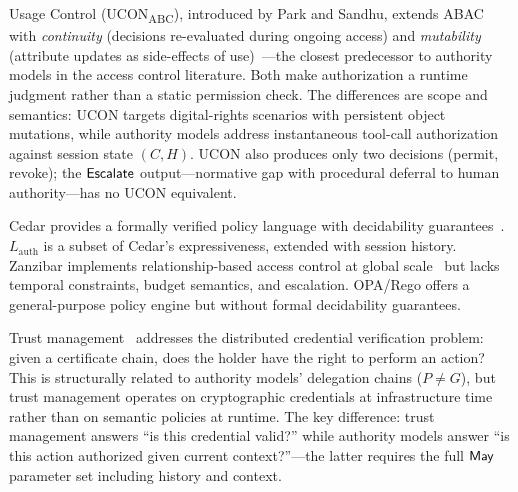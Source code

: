 \documentclass[11pt,a4paper]{article}
\newcommand{\termlabel}[1]{\ifmmode\mathsf{#1}\else{\normalfont\textsc{\MakeLowercase{#1}}}\fi}
\newcommand{\May}{\termlabel{May}}
\newcommand{\Escalate}{\termlabel{Escalate}}
\begin{document}
Usage Control (UCON\textsubscript{ABC}), introduced by Park and Sandhu, extends ABAC with \emph{continuity} (decisions re-evaluated during ongoing access) and \emph{mutability} (attribute updates as side-effects of use)~\citep{park2004ucon}---the closest predecessor to authority models in the access control literature. Both make authorization a runtime judgment rather than a static permission check. The differences are scope and semantics: UCON targets digital-rights scenarios with persistent object mutations, while authority models address instantaneous tool-call authorization against session state $(C, H)$. UCON also produces only two decisions (permit, revoke); the $\Escalate$ output---normative gap with procedural deferral to human authority---has no UCON equivalent.

Cedar provides a formally verified policy language with decidability guarantees~\citep{cutler2024cedar}. $L_{\mathrm{auth}}$ is a subset of Cedar's expressiveness, extended with session history. Zanzibar implements relationship-based access control at global scale~\citep{pang2019zanzibar} but lacks temporal constraints, budget semantics, and escalation. OPA/Rego offers a general-purpose policy engine but without formal decidability guarantees.

Trust management~\citep{blaze1999policymaker, li2003rt} addresses the distributed credential verification problem: given a certificate chain, does the holder have the right to perform an action? This is structurally related to authority models' delegation chains ($P \neq G$), but trust management operates on cryptographic credentials at infrastructure time rather than on semantic policies at runtime. The key difference: trust management answers ``is this credential valid?'' while authority models answer ``is this action authorized given current context?''---the latter requires the full $\May$ parameter set including history and context.
\end{document}
